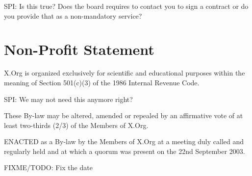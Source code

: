 \documentclass[10pt, english]{bylaws}
\begin{document}
SPI: Is this true? Does the board requires to contact you to sign a contract or
do you provide that as a non-mandatory service?

\section{Non-Profit Statement}
X.Org is organized exclusively for scientific and educational purposes within
the meaning of  Section 501(c)(3) of the 1986 Internal Revenue Code.

SPI: We may not need this anymore right?

These By-law may be altered, amended or repealed by an affirmative vote of
at least two-thirds (2/3) of the Members of X.Org.

ENACTED as a By-law by the Members of X.Org at a meeting duly called and
regularly held and at which a quorum was present on the 22nd September 2003.

FIXME/TODO: Fix the date
\end{document}
